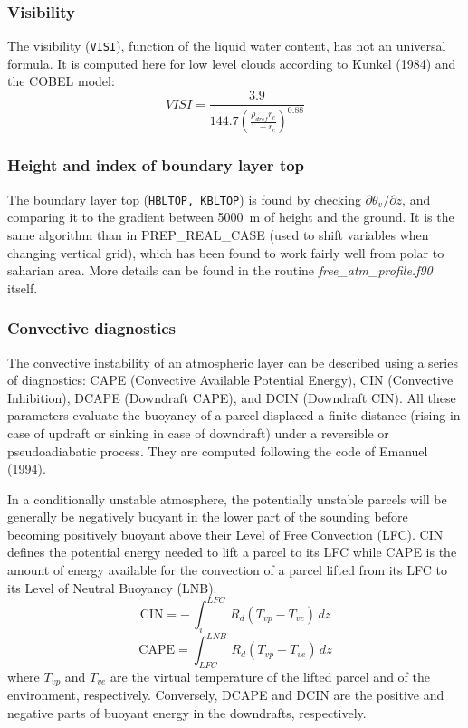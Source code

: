 \subsubsection{Visibility}
The visibility ({\tt VISI}), function of the liquid water content, has not an universal formula.
It is computed here for low level clouds according to Kunkel (1984)
and the COBEL model:
\begin{equation}
VISI=\frac{3.9}{144.7(\frac{\rho_{dref}r_c}{1.+r_c})^{0.88}}
\end{equation}

\subsubsection{Height and index of boundary layer top}
The boundary layer top  ({\tt HBLTOP, KBLTOP}) is found by checking 
$\partial\theta_v/\partial z$, and comparing it to the gradient
between 5000~m of
height and the ground. It is the same algorithm than in PREP\_REAL\_CASE (used
to shift variables when changing vertical grid), which has been found to work 
fairly well from polar to saharian area. More details can be found in the 
routine {\it free\_atm\_profile.f90} itself.

\subsubsection{Convective diagnostics}
The convective instability of an atmospheric layer can be described using a series of diagnostics: CAPE (Convective Available Potential Energy), CIN (Convective Inhibition), DCAPE (Downdraft CAPE), and DCIN (Downdraft CIN). All these parameters evaluate the buoyancy of a parcel displaced a finite distance (rising in case of updraft or sinking in case of downdraft) under a reversible or pseudoadiabatic process. They are computed following the code of Emanuel (1994).

In a conditionally unstable atmosphere, the potentially unstable parcels will be generally be negatively buoyant in the lower part of the sounding before becoming positively buoyant above their Level of Free Convection (LFC). CIN defines the potential energy needed to lift a parcel to its LFC while CAPE is the amount of energy available for the convection of a parcel lifted from its LFC to its Level of Neutral Buoyancy (LNB). 
\begin{equation}
\mbox{CIN}= - \, \int_{i}^{LFC} \, R_d ( T_{vp} - T_{ve}) \, dz
\end{equation}
\begin{equation}
\mbox{CAPE}=\int_{LFC}^{LNB} \, R_d ( T_{vp} - T_{ve}) \, dz
\end{equation}
where $T_{vp}$ and $T_{ve}$ are the virtual temperature of the lifted parcel and of the environment, respectively. Conversely, DCAPE and DCIN are the positive and negative parts of buoyant energy in the downdrafts, respectively.



